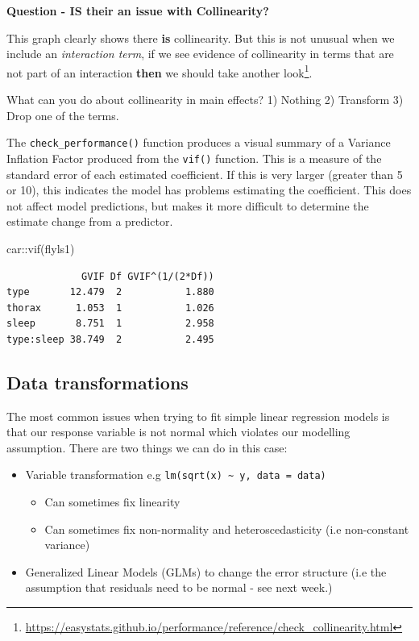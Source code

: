 \documentclass[
]{book}
\newenvironment{Shaded}{\begin{snugshade}}{\end{snugshade}}
\newcommand{\FunctionTok}[1]{\textcolor[rgb]{0.00,0.00,0.00}{#1}}
\newcommand{\NormalTok}[1]{#1}
\newcommand{\SpecialCharTok}[1]{\textcolor[rgb]{0.00,0.00,0.00}{#1}}
\begin{document}
\textbf{Question - IS their an issue with Collinearity?}

This graph clearly shows there \textbf{is} collinearity. But this is not unusual when we include an \emph{interaction term}, if we see evidence of collinearity in terms that are not part of an interaction \textbf{then} we should take another look\footnote{\url{https://easystats.github.io/performance/reference/check_collinearity.html}}.

What can you do about collinearity in main effects? 1) Nothing 2) Transform 3) Drop one of the terms.

The \texttt{check\_performance()} function produces a visual summary of a Variance Inflation Factor produced from the \texttt{vif()} function. This is a measure of the standard error of each estimated coefficient. If this is very larger (greater than 5 or 10), this indicates the model has problems estimating the coefficient. This does not affect model predictions, but makes it more difficult to determine the estimate change from a predictor.

\begin{Shaded}
\begin{Highlighting}[]
\NormalTok{car}\SpecialCharTok{::}\FunctionTok{vif}\NormalTok{(flyls1)}
\end{Highlighting}
\end{Shaded}

\begin{verbatim}
             GVIF Df GVIF^(1/(2*Df))
type       12.479  2           1.880
thorax      1.053  1           1.026
sleep       8.751  1           2.958
type:sleep 38.749  2           2.495
\end{verbatim}

\hypertarget{data-transformations}{%
\subsection{Data transformations}\label{data-transformations}}

The most common issues when trying to fit simple linear regression models is that our response variable is not normal which violates our modelling assumption. There are two things we can do in this case:

\begin{itemize}
\item
  Variable transformation e.g \texttt{lm(sqrt(x)\ \textasciitilde{}\ y,\ data\ =\ data)}

  \begin{itemize}
  \item
    Can sometimes fix linearity
  \item
    Can sometimes fix non-normality and heteroscedasticity (i.e non-constant variance)
  \end{itemize}
\item
  Generalized Linear Models (GLMs) to change the error structure (i.e the assumption that residuals need to be normal - see next week.)
\end{itemize}
\end{document}
